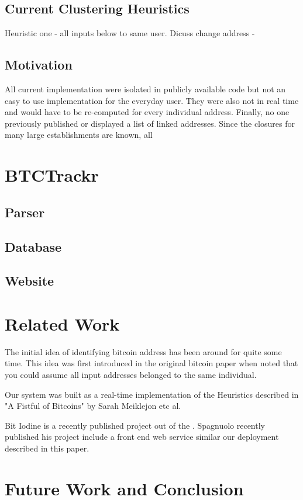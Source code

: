 \documentclass[10pt, letterpaper, twocolumn, twoside]{article}
\begin{document}
\subsection{Current Clustering Heuristics}
Heuristic one - all inputs below to same user.
Dicuss change address - 

\subsection{Motivation}
All current implementation were isolated in publicly available code but not an easy to use implementation for the everyday user. They were also not in real time and would have to be re-computed for every individual address. Finally, no one previously published or displayed a list of linked addresses. Since the closures for many large establishments are known, all


\section{BTCTrackr}

\subsection{Parser}

\subsection{Database}

\subsection{Website}

\section{Related Work}
\label{related}
The initial idea of identifying bitcoin address has been around for quite some time. This idea was first introduced in the original bitcoin paper when noted that you could assume all input addresses belonged to the same individual.

Our system was built as a real-time implementation of the Heuristics described in "A Fistful of Bitcoins" by Sarah Meiklejon etc al. 

Bit Iodine is a recently published project out of the . Spagnuolo recently published his project include a front end web service similar our deployment described in this paper.


\section{Future Work and Conclusion}




\end{document}
